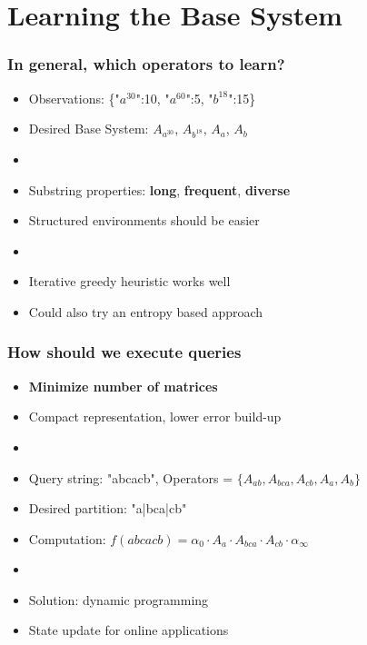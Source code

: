 \documentclass{beamer}
\begin{document}


\section{Learning the Base System}

\begin{frame}
\frametitle{In general, which operators to learn?}
\begin{itemize}


\item Observations: \{"$a^{30}$":10, "$a^{60}$":5, "$b^{18}$":15\}

\item[] Desired Base System: $A_{a^{30}}$, $A_{b^{18}}$, $A_a$, $A_b$
\item[]

\item Substring properties: 
\textbf{long}, \textbf{frequent}, \textbf{diverse}
\item[] Structured environments should be easier
\item[]

\item Iterative greedy heuristic works well
\item[] Could also try an entropy based approach

\end{itemize}
\end{frame}


\begin{frame}
\frametitle{How should we execute queries}
\begin{itemize}

\item \textbf{Minimize number of matrices}
\item[] Compact representation, lower error build-up 
\item[]

\item Query string: "abcacb", Operators = $\{A_{ab}, A_{bca}, A_{cb}, A_a, A_b \}$ 


\item[] Desired partition: "a|bca|cb"
\item[] Computation: $f(abcacb)=\alpha_0 \cdot A_a \cdot A_{bca} \cdot A_{cb} \cdot \alpha_\infty$ 
\item[]

\item Solution: dynamic programming
\item[] State update for online applications

\end{itemize}
\end{frame}
\end{document}
